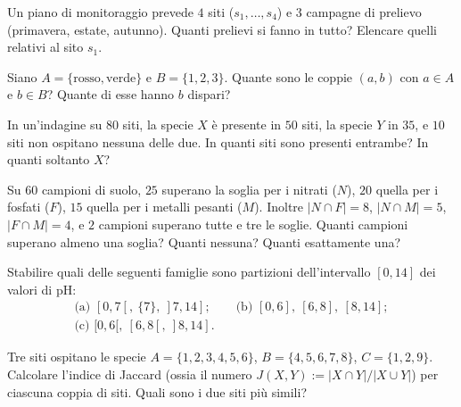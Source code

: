 \begin{esercizio}[\liv{1}]
Un piano di monitoraggio prevede $4$ siti ($s_1,\dots,s_4$) e $3$ campagne di prelievo (primavera, estate, autunno). Quanti prelievi si fanno in tutto? Elencare quelli relativi al sito $s_1$.
\end{esercizio}

\begin{esercizio}[\liv{1}]
Siano $A=\{\text{rosso},\text{verde}\}$ e $B=\{1,2,3\}$. Quante sono le coppie $(a,b)$ con $a\in A$ e $b\in B$? Quante di esse hanno $b$ dispari?
\end{esercizio}

\begin{esercizio}[\liv{2}]
In un'indagine su $80$ siti, la specie $X$ \`e presente in $50$ siti, la specie $Y$ in $35$, e $10$ siti non ospitano nessuna delle due. In quanti siti sono presenti entrambe? In quanti soltanto $X$?
\end{esercizio}

\begin{esercizio}[\liv{2}]
Su $60$ campioni di suolo, $25$ superano la soglia per i nitrati ($N$), $20$ quella per i fosfati ($F$), $15$ quella per i metalli pesanti ($M$). Inoltre $|N\cap F|=8$, $|N\cap M|=5$, $|F\cap M|=4$, e $2$ campioni superano tutte e tre le soglie. Quanti campioni superano almeno una soglia? Quanti nessuna? Quanti esattamente una?
\end{esercizio}

\begin{esercizio}[\liv{2}]
Stabilire quali delle seguenti famiglie sono partizioni dell'intervallo $[0,14]$ dei valori di pH:
\begin{gather*}
\text{(a) } [0,7[,\ \{7\},\ ]7,14];\qquad \text{(b) } [0,6],\ [6,8],\ [8,14];\\
\text{(c) } [0,6[,\ [6,8[,\ ]8,14].
\end{gather*}
\end{esercizio}

\begin{esercizio}[\liv{2}]
Tre siti ospitano le specie $A=\{1,2,3,4,5,6\}$, $B=\{4,5,6,7,8\}$, $C=\{1,2,9\}$. Calcolare l'indice di Jaccard (ossia il numero $J(X,Y):=|X\cap Y|/|X\cup Y|$) per ciascuna coppia di siti. Quali sono i due siti pi\`u simili?
\end{esercizio}

